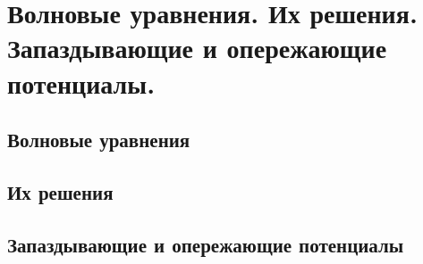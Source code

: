 \chapter{Волновые уравнения. Их решения. Запаздывающие и опережающие 
потенциалы.}

\section{Волновые уравнения}
\section{Их решения}
\section{Запаздывающие и опережающие потенциалы}

